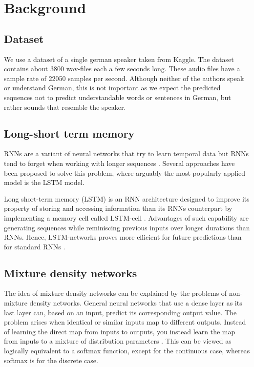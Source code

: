 \documentclass[conference]{IEEEtran}
\begin{document}
\section{Background}

\subsection{Dataset}
We use a dataset of a single german speaker taken from Kaggle. The dataset contains about 3800 wav-files each a few seconds long. These audio files have a sample rate of 22050 samples per second. 
Although neither of the authors speak or understand German, this is not important as we expect the predicted sequences not to predict understandable words or sentences in German, but rather sounds that resemble the speaker.

\subsection{Long-short term memory}
RNNs are a variant of neural networks that try to learn temporal data but RNNs tend to forget when working with longer sequences \cite{b6, b8}. Several approaches have been proposed to solve this problem, where arguably the most popularly applied model is the LSTM model. 

Long short-term memory (LSTM) is an RNN architecture designed to improve its property of storing and accessing information than its RNNs counterpart by implementing a memory cell called LSTM-cell \cite{b13}. Advantages of such capability are generating sequences while reminiscing previous inputs over longer durations than RNNs. Hence, LSTM-networks proves more efficient for future predictions than for standard RNNs \cite{b6}.

\subsection{Mixture density networks}
The idea of mixture density networks can be explained by the problems of non-mixture density networks. General neural networks that use a dense layer as its last layer can, based on an input, predict its corresponding output value. The problem arises when identical or similar inputs map to different outputs. Instead of learning the direct map from inputs to outputs, you instead learn the map from inputs to a mixture of distribution parameters \cite{b3}. This can be viewed as logically equivalent to a softmax function, except for the continuous case, whereas softmax is for the discrete case.
\end{document}
